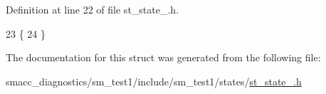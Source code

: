 Definition at line 22 of file st\+\_\+state\+\_.\+h.


\begin{DoxyCode}
23     \{
24     \}
\end{DoxyCode}


The documentation for this struct was generated from the following file\+:\begin{DoxyCompactItemize}
\item 
smacc\+\_\+diagnostics/sm\+\_\+test1/include/sm\+\_\+test1/states/\hyperlink{smacc__diagnostics_2sm__test1_2include_2sm__test1_2states_2st__state__1_8h}{st\+\_\+state\+\_.\+h}\end{DoxyCompactItemize}
